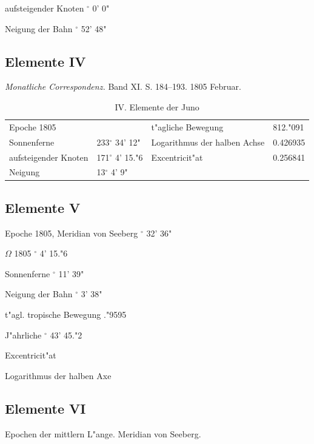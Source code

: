 \documentclass[12pt,a4paper]{article}
\begin{document}
aufsteigender Knoten $^\circ$ 0' 0"

Neigung der Bahn $^\circ$ 52' 48"

\subsection{Elemente IV}

\textit{Monatliche Correspondenz.} Band XI. S. 184--193. 1805 Februar.

\begin{table}[H]
\centering
\begin{tabular}{l l | l l}
\toprule
Epoche 1805 & & t"agliche Bewegung & 812."091 \\
Sonnenferne & 233$^\circ$ 34' 12" & Logarithmus der halben Achse & 0.426935 \\
aufsteigender Knoten & 171$^\circ$ 4' 15."6 & Excentricit"at & 0.256841 \\
Neigung & 13$^\circ$ 4' 9" & & \\
\bottomrule
\end{tabular}
\caption{IV. Elemente der Juno}
\end{table}

\subsection{Elemente V}

Epoche 1805, Meridian von Seeberg $^\circ$ 32' 36"

$\Omega$ 1805 $^\circ$ 4' 15."6

Sonnenferne $^\circ$ 11' 39"

Neigung der Bahn $^\circ$ 3' 38"

t"agl. tropische Bewegung ."9595

J"ahrliche $^\circ$ 43' 45."2

Excentricit"at 

Logarithmus der halben Axe 

\subsection{Elemente VI}

Epochen der mittlern L"ange. Meridian von Seeberg.
\end{document}
